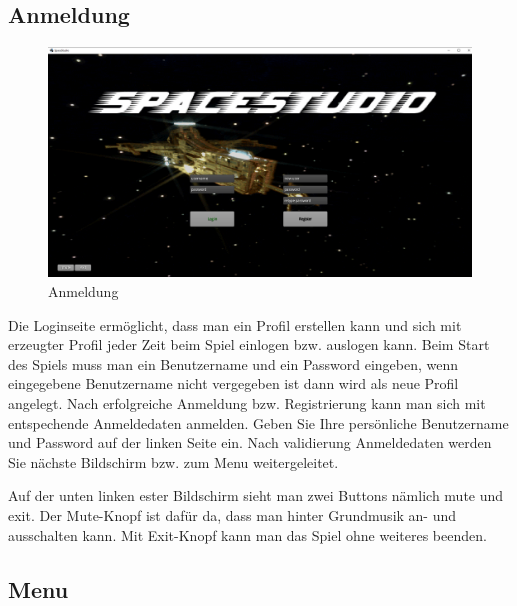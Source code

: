 \documentclass[fontsize=12pt,paper=a4,twoside]{scrartcl}
\begin{document}
\subsection{Anmeldung}
\begin{figure}[htp]
	\includegraphics[width=1.00\linewidth]{pics/loginscreen.png}
	\caption{Anmeldung}
	\label{fig1}
\end{figure}
Die Loginseite ermöglicht, dass man ein Profil erstellen kann und sich mit erzeugter Profil jeder Zeit beim Spiel einlogen bzw. auslogen kann. Beim Start des Spiels muss man ein Benutzername und ein Password eingeben, wenn eingegebene Benutzername nicht vergegeben ist dann wird als neue Profil angelegt. Nach erfolgreiche Anmeldung bzw. Registrierung kann man sich mit entspechende Anmeldedaten anmelden. Geben Sie Ihre persönliche Benutzername und Password auf der linken Seite ein. Nach validierung Anmeldedaten werden Sie nächste Bildschirm bzw. zum Menu weitergeleitet. 

Auf der unten linken ester Bildschirm sieht man zwei Buttons nämlich mute und exit. Der Mute-Knopf ist dafür da, dass man hinter Grundmusik an- und ausschalten kann. Mit Exit-Knopf kann man das Spiel ohne weiteres beenden.

\newpage

\subsection{Menu}
\end{document}
